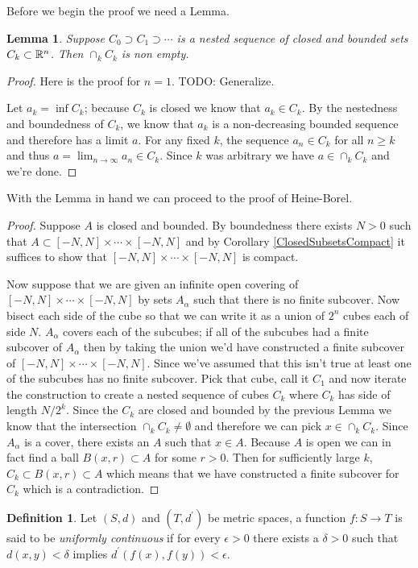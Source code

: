 \documentclass{amsart}
\newtheorem{lem}[thm]{Lemma}
\theoremstyle{remark}
\theoremstyle{definition}
\newtheorem{defn}[thm]{Definition}
\begin{document}
Before we begin the proof we need a Lemma.
\begin{lem}Suppose $C_0 \supset C_1 \supset \cdots$ is a nested
  sequence of closed and bounded sets $C_k \subset \mathbb{R}^n$.  Then
  $\cap_k C_k$ is non empty.
\end{lem}
\begin{proof}Here is the proof for $n=1$.  TODO: Generalize.

Let $a_k = \inf C_k$; because $C_k$ is closed we know that $a_k \in
C_k$.  By the nestedness and boundedness of $C_k$, we know that $a_k$
is a non-decreasing bounded sequence and therefore has a limit $a$.
For any fixed $k$, the sequence $a_n \in C_k$ for all $n \geq k$ and
thus $a=\lim_{n \to \infty} a_n \in C_k$.  Since $k$ was arbitrary we
have $a \in \cap_k C_k$ and we're done.
\end{proof}
With the Lemma in hand we can proceed to the proof of Heine-Borel.
\begin{proof}
Suppose $A$ is closed and bounded.  By boundedness there exists $N>0$
such that $A \subset [-N,N] \times \cdots \times [-N,N]$ and by
Corollary \ref{ClosedSubsetsCompact} it suffices to show that $ [-N,N]
\times \cdots \times [-N,N]$ is compact.

Now suppose that we are given an infinite open covering of $ [-N,N]
\times \cdots \times [-N,N]$ by sets $A_\alpha$ such that there is no
finite subcover.  Now bisect each side of the cube so that we can
write it as a union of $2^n$ cubes each of side $N$.  $A_\alpha$
covers each of the subcubes; if all of the subcubes had a finite
subcover of $A_\alpha$ then by taking the union we'd have constructed
a finite subcover of $ [-N,N]
\times \cdots \times [-N,N]$.  Since we've assumed that this isn't
true at least one of the subcubes has no finite subcover.   Pick that
cube, call it $C_1$ and now iterate the construction to create a
nested sequence of cubes $C_k$ where $C_k$ has side of length
$N/2^k$.  Since the $C_k$ are closed and bounded by the previous Lemma
we know that the intersection $\cap_k C_k \neq \emptyset$ and
therefore we can pick $x \in \cap_k C_k$.  Since $A_\alpha$ is a
cover, there exists an $A$ such that $x \in A$.  Because $A$ is open
we can in fact find a ball $B(x,r) \subset A$ for some $r > 0$.  Then
for sufficiently large $k$, $C_k \subset B(x,r) \subset A$ which means
that we have constructed a finite subcover for $C_k$ which is a contradiction.
\end{proof}

\begin{defn}Let $(S,d)$ and $(T, d^\prime)$ be metric spaces, a
  function $f : S \to T$ is said to be \emph{uniformly continuous} if
  for every $\epsilon > 0$ there exists a $\delta > 0$ such that
  $d(x,y) < \delta$ implies $d^\prime(f(x), f(y)) < \epsilon$.
\end{defn}
\end{document}
